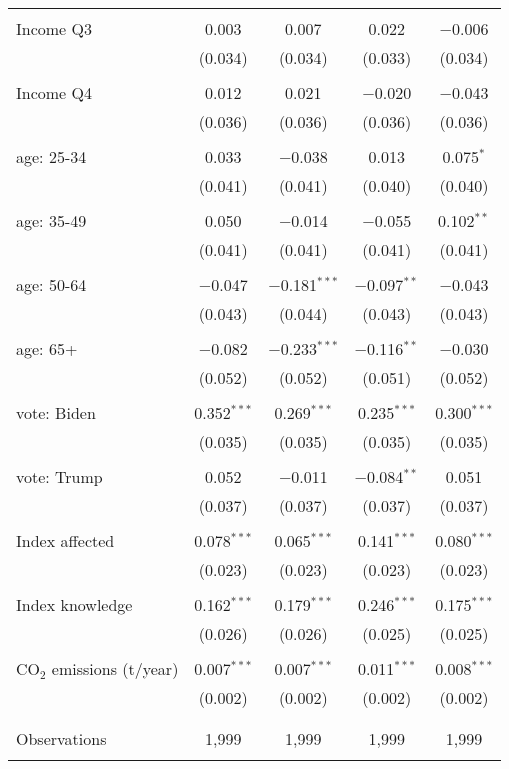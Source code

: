 \begin{tabular}{@{\extracolsep{5pt}}lcccc}
  & & & & \\ 
 Income Q3 & 0.003 & 0.007 & 0.022 & $-$0.006 \\ 
  & (0.034) & (0.034) & (0.033) & (0.034) \\ 
  & & & & \\ 
 Income Q4 & 0.012 & 0.021 & $-$0.020 & $-$0.043 \\ 
  & (0.036) & (0.036) & (0.036) & (0.036) \\ 
  & & & & \\ 
 age: 25-34 & 0.033 & $-$0.038 & 0.013 & 0.075$^{*}$ \\ 
  & (0.041) & (0.041) & (0.040) & (0.040) \\ 
  & & & & \\ 
 age: 35-49 & 0.050 & $-$0.014 & $-$0.055 & 0.102$^{**}$ \\ 
  & (0.041) & (0.041) & (0.041) & (0.041) \\ 
  & & & & \\ 
 age: 50-64 & $-$0.047 & $-$0.181$^{***}$ & $-$0.097$^{**}$ & $-$0.043 \\ 
  & (0.043) & (0.044) & (0.043) & (0.043) \\ 
  & & & & \\ 
 age: 65+ & $-$0.082 & $-$0.233$^{***}$ & $-$0.116$^{**}$ & $-$0.030 \\ 
  & (0.052) & (0.052) & (0.051) & (0.052) \\ 
  & & & & \\ 
 vote: Biden & 0.352$^{***}$ & 0.269$^{***}$ & 0.235$^{***}$ & 0.300$^{***}$ \\ 
  & (0.035) & (0.035) & (0.035) & (0.035) \\ 
  & & & & \\ 
 vote: Trump & 0.052 & $-$0.011 & $-$0.084$^{**}$ & 0.051 \\ 
  & (0.037) & (0.037) & (0.037) & (0.037) \\ 
  & & & & \\ 
 Index affected & 0.078$^{***}$ & 0.065$^{***}$ & 0.141$^{***}$ & 0.080$^{***}$ \\ 
  & (0.023) & (0.023) & (0.023) & (0.023) \\ 
  & & & & \\ 
 Index knowledge & 0.162$^{***}$ & 0.179$^{***}$ & 0.246$^{***}$ & 0.175$^{***}$ \\ 
  & (0.026) & (0.026) & (0.025) & (0.025) \\ 
  & & & & \\ 
 CO$_{2}$ emissions (t/year) & 0.007$^{***}$ & 0.007$^{***}$ & 0.011$^{***}$ & 0.008$^{***}$ \\ 
  & (0.002) & (0.002) & (0.002) & (0.002) \\ 
  & & & & \\ 
\hline \\[-1.8ex] 

Observations & 1,999 & 1,999 & 1,999 & 1,999 \\ 
\hline 
\hline \\[-1.8ex] 
\end{tabular} 